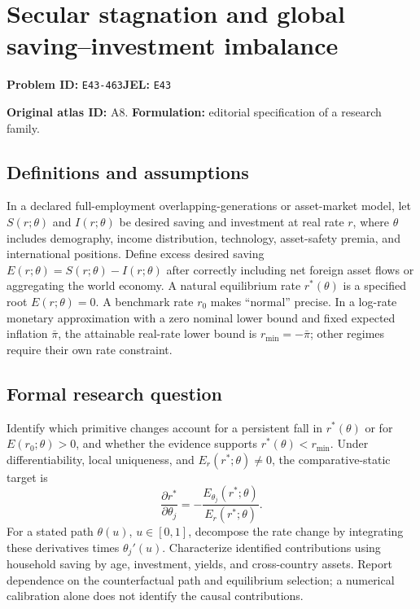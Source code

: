 \documentclass[11pt,a4paper]{article}
\begin{document}
\section*{Secular stagnation and global saving–investment imbalance}
\textbf{Problem ID:} \texttt{E43-463}\quad \textbf{JEL:} \texttt{E43}\par
\label{problem:OP-0018}
\label{atlas:prob:A8}

\noindent\textbf{Original atlas ID:} A8. \textbf{Formulation:} editorial specification of a research family.

\subsection*{Definitions and assumptions}

In a declared full-employment overlapping-generations or asset-market model, let $S(r;\theta)$ and $I(r;\theta)$ be desired saving and investment at real rate $r$, where $\theta$ includes demography, income distribution, technology, asset-safety premia, and international positions. Define excess desired saving $E(r;\theta)=S(r;\theta)-I(r;\theta)$ after correctly including net foreign asset flows or aggregating the world economy. A natural equilibrium rate $r^*(\theta)$ is a specified root $E(r;\theta)=0$. A benchmark rate $r_0$ makes ``normal'' precise. In a log-rate monetary approximation with a zero nominal lower bound and fixed expected inflation $\bar\pi$, the attainable real-rate lower bound is $r_{\min}=-\bar\pi$; other regimes require their own rate constraint.

\subsection*{Formal research question}

Identify which primitive changes account for a persistent fall in $r^*(\theta)$ or for $E(r_0;\theta)>0$, and whether the evidence supports $r^*(\theta)<r_{\min}$. Under differentiability, local uniqueness, and $E_r(r^*;\theta)\ne0$, the comparative-static target is
\[
\frac{\partial r^*}{\partial\theta_j}=-\frac{E_{\theta_j}(r^*;\theta)}{E_r(r^*;\theta)}.
\]
For a stated path $\theta(u)$, $u\in[0,1]$, decompose the rate change by integrating these derivatives times $\theta_j'(u)$. Characterize identified contributions using household saving by age, investment, yields, and cross-country assets. Report dependence on the counterfactual path and equilibrium selection; a numerical calibration alone does not identify the causal contributions.
\end{document}
